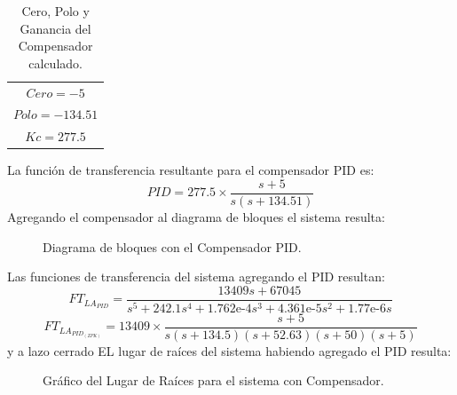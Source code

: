 \documentclass[a4paper,11pt]{article}
\begin{document}

\begin{table}[h!]
\centering
\caption{Cero, Polo y Ganancia del Compensador calculado.}
\begin{tabular}{c}
\hline
\hline 
$\displaystyle Cero = -5$\tabularnewline
$\displaystyle Polo = -134.51$\tabularnewline
$\displaystyle Kc=277.5$\tabularnewline
\hline
\hline
\end{tabular}
\end{table}

La función de transferencia resultante para el compensador PID es:
$$PID=277.5\times\frac{s+5}{s(s+134.51)}$$
Agregando el compensador al diagrama de bloques el sistema resulta:\\

  \begin{figure}[H] %
	\caption{Diagrama de bloques con el Compensador PID.}
	\label{fig:slink_comp}
	\end{figure} 
	
Las funciones de transferencia del sistema agregando el PID resultan:
$$FT_{LA_{PID}}=\frac{13409s+67045}{s^5+242.1s^4+1.762\text{e-}4s^3+4.361\text{e-}5s^2+1.77\text{e-}6s}$$
$$FT_{LA_{PID_{(ZPK)}}}=13409\times\frac{s+5}{s(s+134.5)(s+52.63)(s+50)(s+5)}$$
y a lazo cerrado
EL lugar de raíces del sistema habiendo agregado el PID resulta:

  \begin{figure}[H] %
	\caption{Gráfico del Lugar de Raíces para el sistema con Compensador.}
	\label{fig:FTlazoa_comp_rlocus}
	\end{figure} 
	
\end{document}
